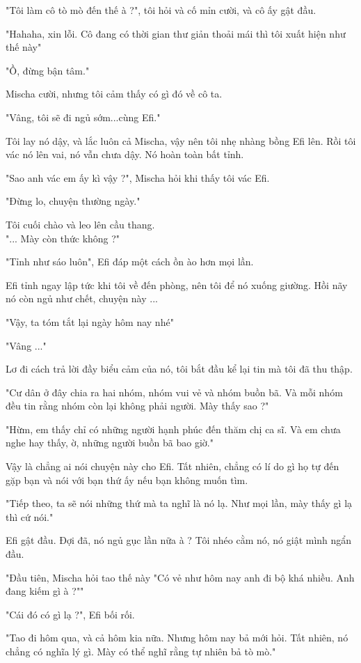 "Tôi làm cô tò mò đến thế à ?", tôi hỏi và cố mỉn cười, và cô ấy gật đầu.

"Hahaha, xin lỗi. Cô đang có thời gian thư giản thoải mái thì tôi xuất hiện như thế này"

"Ồ, đừng bận tâm."

Mischa cười, nhưng tôi cảm thấy có gì đó về cô ta.

"Vâng, tôi sẽ đi ngủ sớm...cùng Efi."

Tôi lay nó dậy, và lắc luôn cả Mischa, vậy nên tôi nhẹ nhàng bồng Efi lên. Rồi tôi vác nó lên vai, nó vẫn chưa dậy. Nó hoàn toàn bất tỉnh.

"Sao anh vác em ấy kì vậy ?", Mischa hỏi khi thấy tôi vác Efi.

"Đừng lo, chuyện thường ngày."

Tôi cuối chào và leo lên cầu thang.\\


"... Mày còn thức không ?"

"Tỉnh như sáo luôn", Efi đáp một cách ồn ào hơn mọi lần.

Efi tỉnh ngay lập tức khi tôi về đến phòng, nên tôi để nó xuống giường. Hồi nãy nó còn ngủ như chết, chuyện này ...

"Vậy, ta tóm tắt lại ngày hôm nay nhé"

"Vâng ..."

Lơ đi cách trả lời đầy biểu cảm của nó, tôi bắt đầu kể lại tin mà tôi đã thu thập.

"Cư dân ở đây chia ra hai nhóm, nhóm vui vẻ và nhóm buồn bã. Và mỗi nhóm đều tin rằng nhóm còn lại không phải người. Mày thấy sao ?"

"Hừm, em thấy chỉ có những người hạnh phúc đến thăm chị ca sĩ. Và em chưa nghe hay thấy, ờ, những người buồn bã bao giờ."

Vậy là chẳng ai nói chuyện này cho Efi. Tất nhiên, chẳng có lí do gì họ tự đến gặp bạn và nói với bạn thứ ấy nếu bạn không muốn tìm.

"Tiếp theo, ta sẽ nói những thứ mà ta nghĩ là nó lạ. Như mọi lần, mày thấy gì lạ thì cứ nói."

Efi gật đầu. Đợi đã, nó ngủ gục lần nữa à ? Tôi nhéo cằm nó, nó giật mình ngẩn đầu.

"Đầu tiên, Mischa hỏi tao thế này "Có vẻ như hôm nay anh đi bộ khá nhiều. Anh đang kiếm gì à ?""

"Cái đó có gì lạ ?", Efi bối rối.

"Tao đi hôm qua, và cả hôm kia nữa. Nhưng hôm nay bả mới hỏi. Tất nhiên, nó chẳng có nghĩa lý gì. Mày có thể nghĩ rằng tự nhiên bả tò mò."

